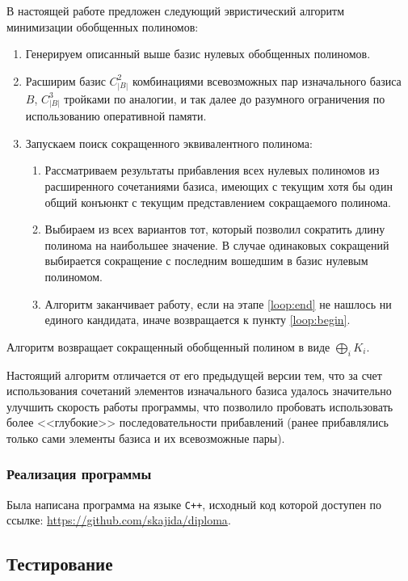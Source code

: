 \documentclass[a4paper,12pt,titlepage]{article}
\begin{document}
В настоящей работе предложен следующий эвристический алгоритм минимизации обобщенных полиномов:
\begin{enumerate}
    \item Генерируем описанный выше базис нулевых обобщенных полиномов.
    \item Расширим базис $ C_{\left| B \right|}^2 $ комбинациями всевозможных пар изначального базиса $ B $, $ C_{\left| B \right|}^3 $ тройками по аналогии, и так далее до разумного ограничения по использованию оперативной памяти.
    \item Запускаем поиск сокращенного эквивалентного полинома:
    \begin{enumerate}
        \item \label{loop:begin} Рассматриваем результаты прибавления всех нулевых полиномов из расширенного сочетаниями базиса, имеющих с текущим хотя бы один общий конъюнкт с текущим представлением сокращаемого полинома.
        \item \label{loop:end} Выбираем из всех вариантов тот, который позволил сократить длину полинома на наибольшее значение. В случае одинаковых сокращений выбирается сокращение с последним вошедшим в базис нулевым полиномом.
        \item Алгоритм заканчивает работу, если на этапе \ref{loop:end} не нашлось ни единого кандидата, иначе возвращается к пункту \ref{loop:begin}.
    \end{enumerate}
\end{enumerate}

Алгоритм возвращает сокращенный обобщенный полином в виде $ \bigoplus\limits_i K_i $.

Настоящий алгоритм отличается от его предыдущей версии тем, что за счет использования сочетаний элементов изначального базиса удалось значительно улучшить скорость работы программы, что позволило пробовать использовать более <<глубокие>> последовательности прибавлений (ранее прибавлялись только сами элементы базиса и их всевозможные пары).

\subsubsection{Реализация программы}

Была написана программа на языке \texttt{C++}, исходный код которой доступен по ссылке: \url{https://github.com/skajida/diploma}.

\subsection{Тестирование}
\end{document}
